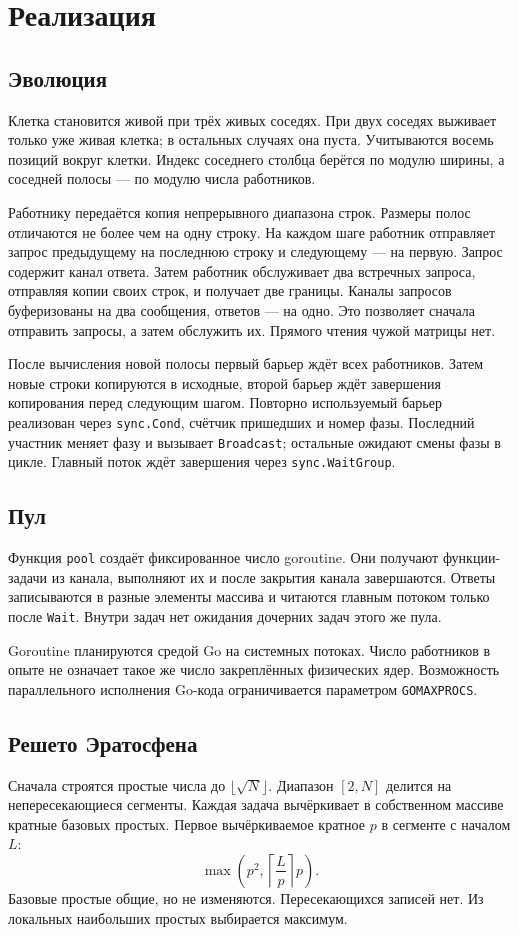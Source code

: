 \documentclass[a4paper,14pt]{extarticle}
\begin{document}
\section{Реализация}
\subsection{Эволюция}
Клетка становится живой при трёх живых соседях. При двух соседях
выживает только уже живая клетка; в остальных случаях она пуста.
Учитываются восемь позиций вокруг клетки.
Индекс соседнего столбца берётся по модулю ширины, а соседней полосы ---
по модулю числа работников.

Работнику передаётся копия непрерывного диапазона строк. Размеры полос
отличаются не более чем на одну строку.
На каждом шаге работник отправляет запрос предыдущему на последнюю
строку и следующему --- на первую. Запрос содержит канал ответа.
Затем работник обслуживает два встречных запроса, отправляя копии
своих строк, и получает две границы.
Каналы запросов буферизованы на два сообщения, ответов --- на одно.
Это позволяет сначала отправить запросы, а затем обслужить их.
Прямого чтения чужой матрицы нет.

После вычисления новой полосы первый барьер ждёт всех работников.
Затем новые строки копируются в исходные, второй барьер ждёт завершения
копирования перед следующим шагом.
Повторно используемый барьер реализован через \texttt{sync.Cond},
счётчик пришедших и номер фазы.
Последний участник меняет фазу и вызывает \texttt{Broadcast};
остальные ожидают смены фазы в цикле.
Главный поток ждёт завершения через \texttt{sync.WaitGroup}.

\subsection{Пул}
Функция \texttt{pool} создаёт фиксированное число goroutine.
Они получают функции-задачи из канала, выполняют их и после закрытия
канала завершаются. Ответы записываются в разные элементы массива
и читаются главным потоком только после \texttt{Wait}.
Внутри задач нет ожидания дочерних задач этого же пула.

Goroutine планируются средой Go на системных потоках.
Число работников в опыте не означает такое же число закреплённых
физических ядер. Возможность параллельного исполнения Go-кода
ограничивается параметром \texttt{GOMAXPROCS}.

\subsection{Решето Эратосфена}
Сначала строятся простые числа до $\lfloor\sqrt{N}\rfloor$.
Диапазон $[2,N]$ делится на непересекающиеся сегменты.
Каждая задача вычёркивает в собственном массиве кратные базовых простых.
Первое вычёркиваемое кратное $p$ в сегменте с началом $L$:
\[
\max\left(p^2,\left\lceil\frac{L}{p}\right\rceil p\right).
\]
Базовые простые общие, но не изменяются. Пересекающихся записей нет.
Из локальных наибольших простых выбирается максимум.
\end{document}
